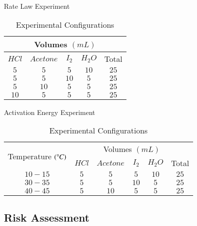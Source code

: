 \begin{table}[!htb]
    \begin{minipage}{.5\linewidth}
      \caption{Rate Law Experiment}
      \centering
		\begin{tabular}{|c|c|c|c|c|} 
		 \hline
		 \multicolumn{5}{|c|}{Volumes $(mL)$} \\
		 \hline
		$HCl$ & $Acetone$ & $I_2$ & $H_2O$ & Total \\
		  \hline
		  $5$ & $5$ & $5$ & $10$ & $25$ \\
		  \hline
		  $5$ & $5$ & $10$ & $5$ & $25$ \\
		  \hline
		  $5$ & $10$ & $5$ & $5$ & $25$ \\
		  \hline
		  $10$ & $5$ & $5$ & $5$ & $25$ \\
		  \hline
		\end{tabular}
		\label{table:1_config}
    \end{minipage}%
    \begin{minipage}{.5\linewidth}
      \centering
        \caption{Activation Energy Experiment}
		\begin{tabular}{|c|c|c|c|c|c|} 
		 \hline
		  \multirow{2}{*}{Temperature $(\degree C)$} & \multicolumn{5}{c|}{Volumes $(mL)$} \\
		  	\cline{2-6}
		 	& $HCl$ & $Acetone$ & $I_2$ & $H_2O$ & Total \\
		  \hline
		  $10-15$ & $5$ & $5$ & $5$ & $10$ & $25$ \\
		  \hline
		  $30-35$ & $5$ & $5$ & $10$ & $5$ & $25$ \\
		  \hline
		  $40-45$ & $5$ & $10$ & $5$ & $5$ & $25$ \\
		  \hline
		\end{tabular}
		\label{table:2_config}
    \end{minipage}
    \caption{Experimental Configurations}
    \label{table:config}
\end{table}

\subsection{Risk Assessment}

